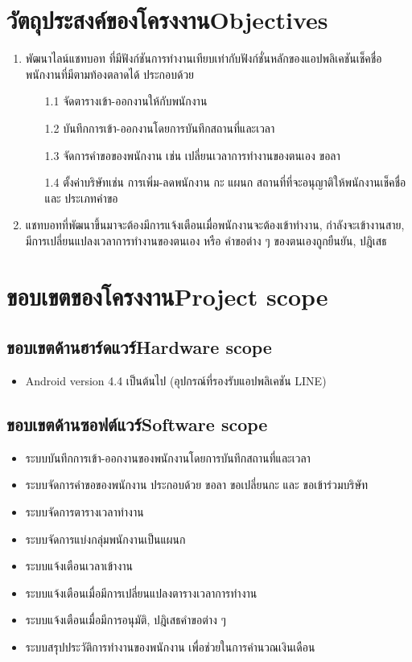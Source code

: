 \section{\ifcpe วัตถุประสงค์ของโครงงาน\else Objectives\fi}
\begin{enumerate}
    \item พัฒนาไลน์แชทบอท ที่มีฟังก์ชันการทำงานเทียบเท่ากับฟังก์ชั่นหลักของแอปพลิเคชันเช็คชื่อพนักงานที่มีตามท้องตลาดได้ ประกอบด้วย 
    \begin{enumerate}
        \item[1.1] จัดตารางเข้า-ออกงานให้กับพนักงาน
        \item[1.2] บันทึกการเข้า-ออกงานโดยการบันทึกสถานที่และเวลา
        \item[1.3] จัดการคำขอของพนักงาน เช่น เปลี่ยนเวลาการทำงานของตนเอง ขอลา
        \item[1.4] ตั้งค่าบริษัทเช่น การเพิ่ม-ลดพนักงาน กะ แผนก สถานที่ที่จะอนุญาติให้พนักงานเช็คชื่อ และ ประเภทคำขอ
    \end{enumerate} 
    \item แชทบอทที่พัฒนาขึ้นมาจะต้องมีการแจ้งเตือนเมื่อพนักงานจะต้องเข้าทำงาน, กำลังจะเข้างานสาย, มีการเปลี่ยนแปลงเวลาการทำงานของตนเอง หรือ คำขอต่าง ๆ ของตนเองถูกยืนยัน, ปฎิเสธ
\end{enumerate}

\section{\ifcpe ขอบเขตของโครงงาน\else Project scope\fi}

\subsection{\ifcpe ขอบเขตด้านฮาร์ดแวร์\else Hardware scope\fi}
\begin{itemize}
    \item Android version 4.4 เป็นต้นไป (อุปกรณ์ที่รองรับแอปพลิเคชัน LINE)
\end{itemize}

\subsection{\ifcpe ขอบเขตด้านซอฟต์แวร์\else Software scope\fi}
\begin{itemize}
    \item ระบบบันทึกการเข้า-ออกงานของพนักงานโดยการบันทึกสถานที่และเวลา
    \item ระบบจัดการคำขอของพนักงาน ประกอบด้วย ขอลา ขอเปลี่ยนกะ และ ขอเข้าร่วมบริษัท
    \item ระบบจัดการตารางเวลาทำงาน
    \item ระบบจัดการแบ่งกลุ่มพนักงานเป็นแผนก
    \item ระบบแจ้งเตือนเวลาเข้างาน
    \item ระบบแจ้งเตือนเมื่อมีการเปลี่ยนแปลงตารางเวลาการทำงาน
    \item ระบบแจ้งเตือนเมื่อมีการอนุมัติ, ปฎิเสธคำขอต่าง ๆ 
    \item ระบบสรุปประวัติการทำงานของพนักงาน เพื่อช่วยในการคำนวณเงินเดือน
\end{itemize}

